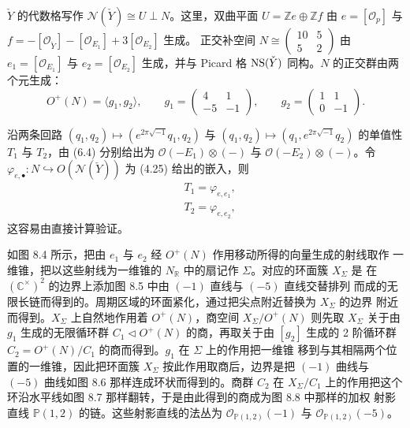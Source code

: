 $\check{Y}$ 的代数格写作 $\mathcal{N}(\check{Y})\cong U\perp N$。这里，双曲平面
$U=\mathbb{Z}e\oplus\mathbb{Z}f$ 由 $e=[\mathcal{O}_p]$ 与
$f=-[\mathcal{O}_{\check{Y}}]-[\mathcal{O}_{E_1}]+3[\mathcal{O}_{E_2}]$ 生成。
正交补空间 $N\cong\left(\begin{smallmatrix}10&5\\5&2\end{smallmatrix}\right)$ 由
$e_1=[\mathcal{O}_{E_1}]$ 与 $e_2=[\mathcal{O}_{E_2}]$ 生成，并与 Picard 格
$\operatorname{NS}(\check{Y})$ 同构。$N$ 的正交群由两个元生成：
\begin{equation}
  O^{+}(N)=\langle g_1,g_2\rangle,\qquad
  g_1=\begin{pmatrix} 4 & 1 \\ -5 & -1 \end{pmatrix},\qquad
  g_2=\begin{pmatrix} 1 & 1 \\ 0 & -1 \end{pmatrix}. \tag{8.30}
\end{equation}

沿两条回路 $(q_1,q_2)\mapsto(e^{2\pi\sqrt{-1}}q_1,q_2)$ 与
$(q_1,q_2)\mapsto(q_1,e^{2\pi\sqrt{-1}}q_2)$ 的单值性 $T_1$ 与 $T_2$，由 (6.4)
分别给出为 $\mathcal{O}(-E_1)\otimes(-)$ 与 $\mathcal{O}(-E_2)\otimes(-)$。令
$\varphi_{e,\bullet}\colon N\hookrightarrow O(\mathcal{N}(\check{Y}))$ 为 (4.25) 给出的嵌入，则
\begin{align}
  & T_1=\varphi_{e,e_1}, \tag{8.31}\\
  & T_2=\varphi_{e,e_2}, \tag{8.32}
\end{align}
这容易由直接计算验证。


如图 8.4 所示，把由 $e_1$ 与 $e_2$ 经 $O^{+}(N)$ 作用移动所得的向量生成的射线取作
一维锥，把以这些射线为一维锥的 $N_{\mathbb{R}}$ 中的扇记作 $\Sigma$。对应的环面簇
$X_{\Sigma}$ 是
在 $(\mathbb{C}^{\times})^{2}$ 的边界上添加图 8.5 中由 $(-1)$ 直线与 $(-5)$ 直线交替排列
而成的无限长链而得到的。周期区域的环面紧化，通过把尖点附近替换为 $X_{\Sigma}$ 的边界
附近而得到。$X_{\Sigma}$ 上自然地作用着 $O^{+}(N)$，商空间 $X_{\Sigma}/O^{+}(N)$ 则先取
$X_{\Sigma}$ 关于由 $g_1$ 生成的无限循环群 $C_1\triangleleft O^{+}(N)$ 的商，再取关于由
$[g_2]$ 生成的 2 阶循环群 $C_2=O^{+}(N)/C_1$ 的商而得到。$g_1$ 在 $\Sigma$ 上的作用把一维锥
移到与其相隔两个位置的一维锥，因此把环面簇 $X_{\Sigma}$ 按此作用取商后，边界是把
$(-1)$ 曲线与 $(-5)$ 曲线如图 8.6 那样连成环状而得到的。商群 $C_2$ 在 $X_{\Sigma}/C_1$
上的作用把这个环沿水平线如图 8.7 那样翻转，于是由此得到的商成为图 8.8 中那样的加权
射影直线 $\mathbb{P}(1,2)$ 的链。这些射影直线的法丛为
$\mathcal{O}_{\mathbb{P}(1,2)}(-1)$ 与 $\mathcal{O}_{\mathbb{P}(1,2)}(-5)$。


